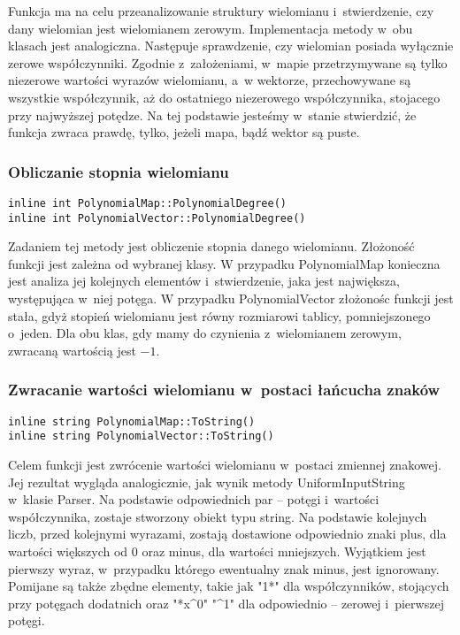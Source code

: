 Funkcja ma na celu przeanalizowanie struktury wielomianu i~stwierdzenie, czy dany wielomian jest wielomianem zerowym. Implementacja metody w~obu klasach jest analogiczna. Następuje sprawdzenie, czy wielomian posiada wyłącznie zerowe współczynniki. Zgodnie z~założeniami, w~mapie przetrzymywane są tylko niezerowe wartości wyrazów wielomianu, a~w wektorze, przechowywane są wszystkie współczynnik, aż do ostatniego niezerowego współczynnika, stojacego przy najwyższej potędze. Na tej podstawie jesteśmy w~stanie stwierdzić, że funkcja zwraca prawdę, tylko, jeżeli mapa, bądź wektor są puste.

\subsubsection{Obliczanie stopnia wielomianu}
\begin{lstlisting}
inline int PolynomialMap::PolynomialDegree()
inline int PolynomialVector::PolynomialDegree()
\end{lstlisting}

Zadaniem tej metody jest obliczenie stopnia danego wielomianu. Złożoność funkcji jest zależna od wybranej klasy. W przypadku PolynomialMap konieczna jest analiza jej kolejnych elementów i~stwierdzenie, jaka jest największa, występująca w~niej potęga. W przypadku PolynomialVector złożonośc funkcji jest stała, gdyż stopień wielomianu jest równy rozmiarowi tablicy, pomniejszonego o~jeden. Dla obu klas, gdy mamy do czynienia z~wielomianem zerowym, zwracaną wartością jest $-1$.

\subsubsection{Zwracanie wartości wielomianu w~postaci łańcucha znaków}
\begin{lstlisting}
inline string PolynomialMap::ToString()
inline string PolynomialVector::ToString()
\end{lstlisting}

Celem funkcji jest zwrócenie wartości wielomianu w~postaci zmiennej znakowej. Jej rezultat wygląda analogicznie, jak wynik metody UniformInputString w~klasie Parser. Na podstawie odpowiednich par – potęgi i~wartości współczynnika, zostaje stworzony obiekt typu string. Na podstawie kolejnych liczb, przed kolejnymi wyrazami, zostają dostawione odpowiednio znaki plus, dla wartości większych od $0$ oraz minus, dla wartości mniejszych. Wyjątkiem jest pierwszy wyraz, w~przypadku którego ewentualny znak minus, jest ignorowany. Pomijane są także zbędne elementy, takie jak "1*" dla współczynników, stojących przy potęgach dodatnich oraz "*x\^{}0" "\^{}1" dla odpowiednio – zerowej i~pierwszej potęgi.

